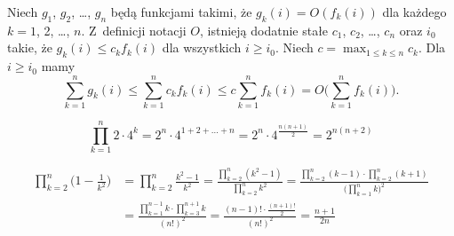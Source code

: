 \exercise %
Niech $g_1$, $g_2$, \dots, $g_n$ będą funkcjami takimi, że $g_k(i)=O(f_k(i))$ dla każdego $k=1$, 2, \dots, $n$.
Z~definicji notacji $O$, istnieją dodatnie stałe $c_1$, $c_2$, \dots, $c_n$ oraz $i_0$ takie, że $g_k(i)\le c_kf_k(i)$ dla wszystkich $i\ge i_0$.
Niech $c=\max_{1\le k\le n}c_k$.
Dla $i\ge i_0$ mamy
\[
	\sum_{k=1}^ng_k(i) \le \sum_{k=1}^nc_kf_k(i) \le c\sum_{k=1}^nf_k(i) = O\biggl(\sum_{k=1}^nf_k(i)\biggr).
\]
%
%

\exercise %
\[
	\prod_{k=1}^n2\cdot4^k = 2^n\cdot4^{1+2+\dots+n} = 2^n\cdot4^{\frac{n(n+1)}{2}} = 2^{n(n+2)}
\]

\exercise %
\begin{align*}
	\prod_{k=2}^n\biggl(1-\frac{1}{k^2}\biggr) &= \prod_{k=2}^n\frac{k^2-1}{k^2} = \frac{\prod_{k=2}^n(k^2-1)}{\prod_{k=2}^nk^2} = \frac{\prod_{k=2}^n(k-1)\cdot\prod_{k=2}^n(k+1)}{\bigl(\prod_{k=1}^nk\bigr)^2} \\[2mm]
	&= \frac{\prod_{k=1}^{n-1}k\cdot\prod_{k=3}^{n+1}k}{(n!)^2} = \frac{(n-1)!\cdot\frac{(n+1)!}{2}}{(n!)^2} = \frac{n+1}{2n}
\end{align*}
